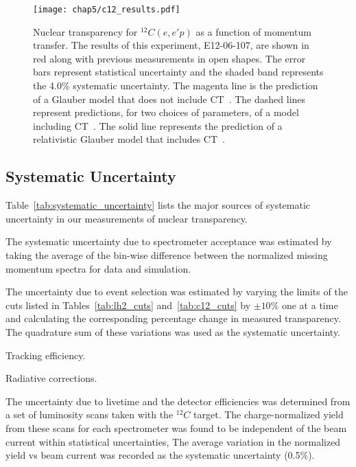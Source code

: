 \begin{figure}[!h]
    \centering
    \texttt{[image: chap5/c12\_results.pdf]}
    \caption[Nuclear transparency for ${}^{12}C(e,e'p)$ as a function of momentum transfer.]{
            Nuclear transparency for ${}^{12}C(e,e'p)$ as a function of
            momentum transfer.
            The results of this experiment, E12-06-107, are shown in red along
            with previous measurements in open shapes.
            The error bars represent statistical uncertainty and the
            shaded band represents the 4.0\% systematic uncertainty.
            The magenta line is the prediction of a Glauber
            model that does not include CT~\cite{Pandharipande_1992}.
            The dashed lines represent predictions, for two choices of
            parameters, of a model including CT~\cite{Frankfurt_1995_PRC}.
            The solid line represents the prediction of a relativistic Glauber
            model that includes CT~\cite{Cosyn_2006}.
            }
    \label{fig:c12_transparency_results}
\end{figure}

\subsection{Systematic Uncertainty}

Table~\ref{tab:systematic_uncertainty} lists the major sources of systematic
uncertainty in our measurements of nuclear transparency.


The systematic uncertainty due to spectrometer acceptance was estimated by
taking the average of the bin-wise difference between the normalized missing
momentum spectra for data and simulation.


The uncertainty due to event selection was estimated by varying the limits of
the cuts listed in Tables~\ref{tab:lh2_cuts} and~\ref{tab:c12_cuts}
by $\pm10\%$ one at a time
and calculating the corresponding percentage change in measured transparency.
The quadrature sum of these variations was used as the systematic uncertainty.


Tracking efficiency.


Radiative corrections.


The uncertainty due to livetime and the detector efficiencies was determined
from a set of luminosity scans taken with the ${}^{12}C$ target.
The charge-normalized yield from these scans for each spectrometer was found to
be independent of the beam current within statistical uncertainties,
The average variation in the normalized yield vs beam current was recorded as the
systematic uncertainty (0.5\%).


